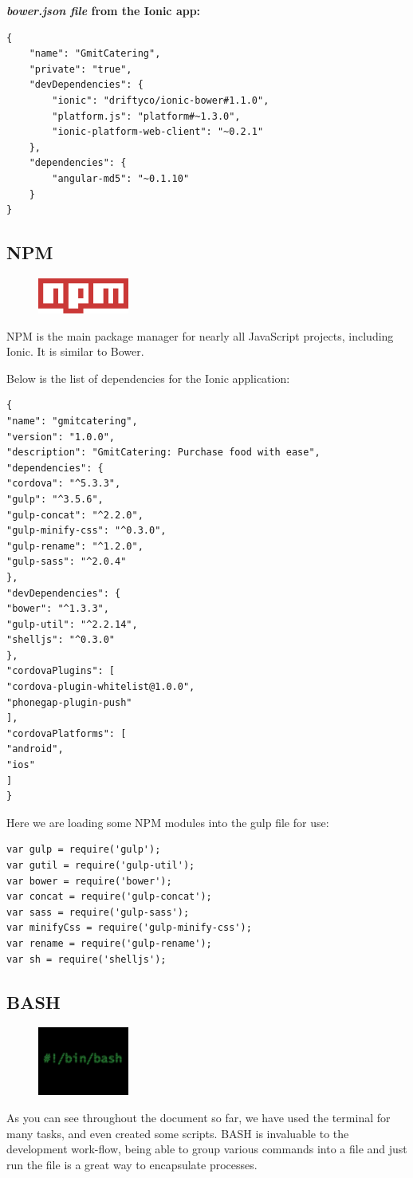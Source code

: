 \textbf{\textit{bower.json file} from the Ionic app:}
\begin{verbatim}
{
    "name": "GmitCatering",
    "private": "true",
    "devDependencies": {
        "ionic": "driftyco/ionic-bower#1.1.0",
        "platform.js": "platform#~1.3.0",
        "ionic-platform-web-client": "~0.2.1"
    },
    "dependencies": {
        "angular-md5": "~0.1.10"
    }
}
\end{verbatim}

\subsection{NPM}
\begin{figure}
\includegraphics[width=3cm]{img/mobile-app/logos/npm.png}
\end{figure} 
NPM \cite{npm} is the main package manager for nearly all JavaScript projects, including Ionic.
It is similar to Bower.

Below is the list of dependencies for the Ionic application:
\begin{verbatim}
{
"name": "gmitcatering",
"version": "1.0.0",
"description": "GmitCatering: Purchase food with ease",
"dependencies": {
"cordova": "^5.3.3",
"gulp": "^3.5.6",
"gulp-concat": "^2.2.0",
"gulp-minify-css": "^0.3.0",
"gulp-rename": "^1.2.0",
"gulp-sass": "^2.0.4"
},
"devDependencies": {
"bower": "^1.3.3",
"gulp-util": "^2.2.14",
"shelljs": "^0.3.0"
},
"cordovaPlugins": [
"cordova-plugin-whitelist@1.0.0",
"phonegap-plugin-push"
],
"cordovaPlatforms": [
"android",
"ios"
]
}
\end{verbatim}

Here we are loading some NPM modules into the gulp file for use:
\begin{verbatim}
var gulp = require('gulp');
var gutil = require('gulp-util');
var bower = require('bower');
var concat = require('gulp-concat');
var sass = require('gulp-sass');
var minifyCss = require('gulp-minify-css');
var rename = require('gulp-rename');
var sh = require('shelljs');
\end{verbatim}

\subsection{BASH}
\begin{figure}
\includegraphics[width=3cm]{img/mobile-app/logos/bash.jpg}
\end{figure} 
As you can see throughout the document so far, we have used the terminal for many tasks, and even created some scripts.
BASH \cite{bash} is invaluable to the development work-flow, being able to group various commands into a file and just run the file is a great way to encapsulate processes. 

